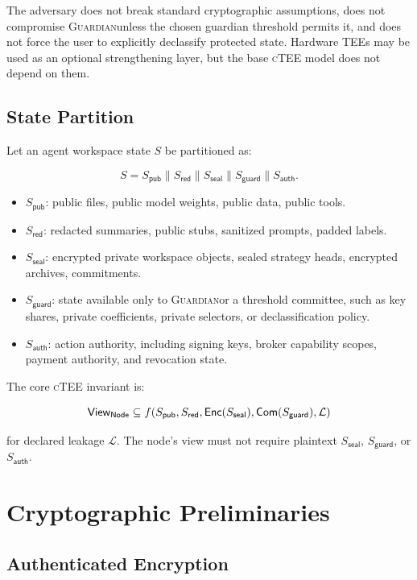 \documentclass[11pt]{article}
\newcommand{\ctee}{\textnormal{\textsc{cTEE}}}
\newcommand{\roletext}[1]{\textnormal{\textsc{#1}}\xspace}
\newcommand{\node}{\ifmmode\mathsf{Node}\else\roletext{Node}\fi}
\newcommand{\guard}{\ifmmode\mathsf{Guardian}\else\roletext{Guardian}\fi}
\newcommand{\enc}{\ensuremath{\mathsf{Enc}}}
\newcommand{\commit}{\ensuremath{\mathsf{Com}}}
\newcommand{\leak}{\mathcal{L}}
\newcommand{\view}{\mathsf{View}}
\begin{document}
The adversary does not break standard cryptographic assumptions, does not
compromise \guard unless the chosen guardian threshold permits it, and does not
force the user to explicitly declassify protected state. Hardware TEEs may be
used as an optional strengthening layer, but the base \ctee{} model does not
depend on them.

\subsection{State Partition}

Let an agent workspace state \(S\) be partitioned as:

\[
S = S_{\mathsf{pub}} \parallel S_{\mathsf{red}} \parallel
    S_{\mathsf{seal}} \parallel S_{\mathsf{guard}} \parallel
    S_{\mathsf{auth}}.
\]

\begin{itemize}[leftmargin=1.5em]
\item \(S_{\mathsf{pub}}\): public files, public model weights, public data,
public tools.
\item \(S_{\mathsf{red}}\): redacted summaries, public stubs, sanitized
prompts, padded labels.
\item \(S_{\mathsf{seal}}\): encrypted private workspace objects, sealed
strategy heads, encrypted archives, commitments.
\item \(S_{\mathsf{guard}}\): state available only to \guard or a threshold
committee, such as key shares, private coefficients, private selectors, or
declassification policy.
\item \(S_{\mathsf{auth}}\): action authority, including signing keys, broker
capability scopes, payment authority, and revocation state.
\end{itemize}

The core \ctee{} invariant is:

\[
\view_{\node} \subseteq
f(S_{\mathsf{pub}}, S_{\mathsf{red}}, \enc(S_{\mathsf{seal}}),
  \commit(S_{\mathsf{guard}}), \leak)
\]

\noindent for declared leakage \(\leak\). The node's view must not require
plaintext \(S_{\mathsf{seal}}\), \(S_{\mathsf{guard}}\), or \(S_{\mathsf{auth}}\).

\section{Cryptographic Preliminaries}

\subsection{Authenticated Encryption}
\end{document}
